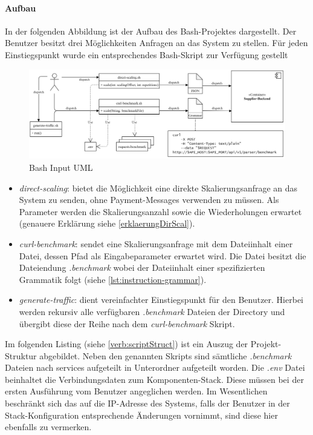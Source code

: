 \paragraph{Aufbau}
In der folgenden Abbildung ist der Aufbau des Bash-Projektes dargestellt. Der Benutzer besitzt drei Möglichkeiten Anfragen an das System zu stellen. Für jeden  Einstiegspunkt wurde ein entsprechendes Bash-Skript zur Verfügung gestellt

\begin{figure}[ht!]
	\centering
	\includegraphics[width=\linewidth]{kapitel/problemloesung/implementierung/_img/input-uml}
	\caption[Bash Input UML]{Bash Input UML}
	\label{fig:bashOverview}
\end{figure}

\begin{itemize}
  \item \emph{direct-scaling}: bietet die Möglichkeit eine direkte Skalierungsanfrage an das System zu senden, ohne Payment-Messages verwenden zu müssen. Als Parameter werden die Skalierungsanzahl sowie die Wiederholungen erwartet (genauere Erklärung siehe \ref{erklaerungDirScal}).
  \item \emph{curl-benchmark}: sendet eine Skalierungsanfrage mit dem Dateiinhalt einer Datei, dessen Pfad als Eingabeparameter erwartet wird. Die Datei besitzt die Dateiendung \emph{.benchmark} wobei der Dateiinhalt einer spezifizierten Grammatik folgt (siehe \ref{lst:instruction-grammar}).
  \item \emph{generate-traffic}: dient vereinfachter Einstiegspunkt für den Benutzer. Hierbei werden rekursiv alle verfügbaren \emph{.benchmark} Dateien der Directory und übergibt diese der Reihe nach dem \emph{curl-benchmark} Skript.
\end{itemize}

Im folgenden Listing (siehe \ref{verb:scriptStruct}) ist ein Auszug der Projekt-Struktur abgebildet. Neben den genannten Skripts sind sämtliche \emph{.benchmark} Dateien nach services aufgeteilt in Unterordner aufgeteilt worden. Die \emph{.env} Datei beinhaltet die Verbindungsdaten zum Komponenten-Stack. Diese müssen bei der ersten Ausführung vom Benutzer angeglichen werden. Im Wesentlichen beschränkt sich das auf die IP-Adresse des Systems, falls der Benutzer in der Stack-Konfiguration entsprechende Änderungen vornimmt, sind diese hier ebenfalls zu vermerken.

